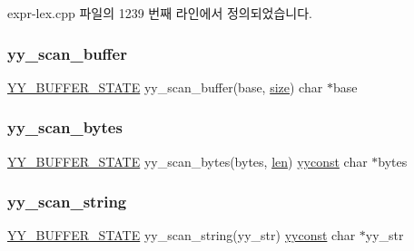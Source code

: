 expr-\/lex.\+cpp 파일의 1239 번째 라인에서 정의되었습니다.

\mbox{\label{expr-lex_8cpp_af9ed770023a73cfa0b6cfd90b5a76fc9}} 
\subsubsection{\texorpdfstring{yy\+\_\+scan\+\_\+buffer}{yy\_scan\_buffer}}
{\footnotesize\ttfamily \mbox{\hyperlink{expr-lex_8cpp_a4e5bd2d129903df83f3d13effaf8f3e4}{Y\+Y\+\_\+\+B\+U\+F\+F\+E\+R\+\_\+\+S\+T\+A\+TE}} yy\+\_\+scan\+\_\+buffer(base, \mbox{\hyperlink{expr-lex_8cpp_ab7d671599a7b25ca99a487fa341bc33a}{size}}) char $\ast$base}

\mbox{\label{expr-lex_8cpp_afe1a1d0d2103208153f7037bef67be96}} 
\subsubsection{\texorpdfstring{yy\+\_\+scan\+\_\+bytes}{yy\_scan\_bytes}}
{\footnotesize\ttfamily \mbox{\hyperlink{expr-lex_8cpp_a4e5bd2d129903df83f3d13effaf8f3e4}{Y\+Y\+\_\+\+B\+U\+F\+F\+E\+R\+\_\+\+S\+T\+A\+TE}} yy\+\_\+scan\+\_\+bytes(bytes, \mbox{\hyperlink{expr-lex_8cpp_afed088663f8704004425cdae2120b9b3}{len}}) \mbox{\hyperlink{expr-lex_8cpp_aa2f1a918be586b44bf08126bde2d7cc9}{yyconst}} char $\ast$bytes}

\mbox{\label{expr-lex_8cpp_ac0d3a22f8bc4cc5e7af2783fe375d5b0}} 
\subsubsection{\texorpdfstring{yy\+\_\+scan\+\_\+string}{yy\_scan\_string}}
{\footnotesize\ttfamily \mbox{\hyperlink{expr-lex_8cpp_a4e5bd2d129903df83f3d13effaf8f3e4}{Y\+Y\+\_\+\+B\+U\+F\+F\+E\+R\+\_\+\+S\+T\+A\+TE}} yy\+\_\+scan\+\_\+string(yy\+\_\+str) \mbox{\hyperlink{expr-lex_8cpp_aa2f1a918be586b44bf08126bde2d7cc9}{yyconst}} char $\ast$yy\+\_\+str}


